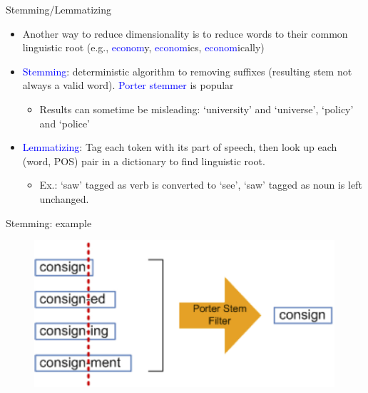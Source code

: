 \documentclass[english]{beamer}
\begin{document}
\begin{frame}{Stemming/Lemmatizing}
\begin{itemize}
\setlength{\itemsep}{1.2em}

\item Another way to reduce dimensionality is to reduce words to their common linguistic root (e.g., \textcolor{blue}{econom}y, \textcolor{blue}{econom}ics, \textcolor{blue}{econom}ically)

\pause

\item \textcolor{blue}{Stemming}: deterministic algorithm to removing suffixes (resulting stem not always a valid word). \textcolor{blue}{Porter stemmer} is popular
\vspace{5pt}
\begin{itemize}
\item Results can sometime be misleading: `university' and `universe', `policy' and `police'
\end{itemize}

\pause

\item \textcolor{blue}{Lemmatizing}: Tag each token with its part of speech, then look up each (word, POS) pair in a dictionary to find linguistic root. 
\vspace{5pt}
\begin{itemize}
\item Ex.: `saw' tagged as verb is converted to `see', `saw' tagged as noun is left unchanged.
\end{itemize}

\end{itemize}

\end{frame}

\begin{frame}{Stemming: example}
\begin{figure}[h]
\begin{centering}
\includegraphics[height=2.15in]{Images/fig12}
\end{centering}
\end{figure}
\end{frame}
\end{document}

